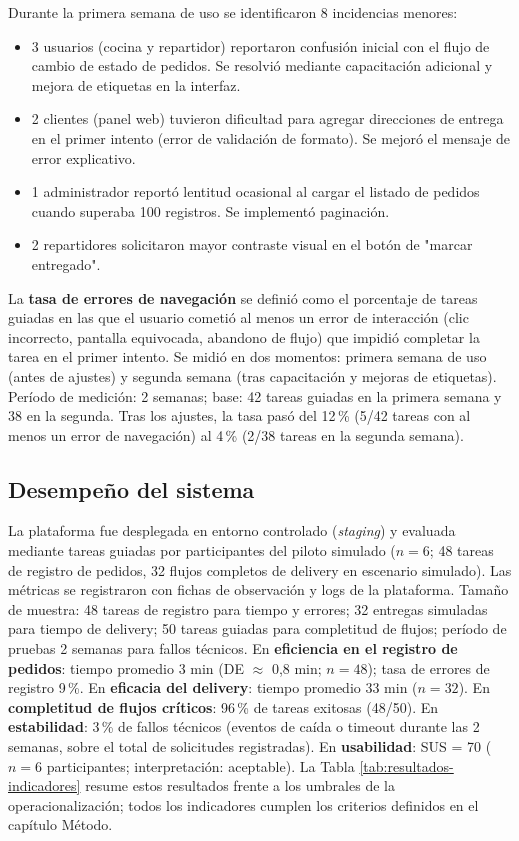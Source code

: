 Durante la primera semana de uso se identificaron 8 incidencias menores:
\begin{itemize}
  \item 3 usuarios (cocina y repartidor) reportaron confusión inicial con el flujo de cambio de estado de pedidos. Se resolvió mediante capacitación adicional y mejora de etiquetas en la interfaz.
  \item 2 clientes (panel web) tuvieron dificultad para agregar direcciones de entrega en el primer intento (error de validación de formato). Se mejoró el mensaje de error explicativo.
  \item 1 administrador reportó lentitud ocasional al cargar el listado de pedidos cuando superaba 100 registros. Se implementó paginación.
  \item 2 repartidores solicitaron mayor contraste visual en el botón de "marcar entregado".
\end{itemize}

La \textbf{tasa de errores de navegación} se definió como el porcentaje de tareas guiadas en las que el usuario cometió al menos un error de interacción (clic incorrecto, pantalla equivocada, abandono de flujo) que impidió completar la tarea en el primer intento. Se midió en dos momentos: primera semana de uso (antes de ajustes) y segunda semana (tras capacitación y mejoras de etiquetas). Período de medición: 2 semanas; base: 42 tareas guiadas en la primera semana y 38 en la segunda. Tras los ajustes, la tasa pasó del 12\,\% (5/42 tareas con al menos un error de navegación) al 4\,\% (2/38 tareas en la segunda semana).

\subsection{Desempeño del sistema }

La plataforma fue desplegada en entorno controlado (\textit{staging}) y evaluada mediante tareas guiadas por participantes del piloto simulado ($n = 6$; 48 tareas de registro de pedidos, 32 flujos completos de delivery en escenario simulado). Las métricas se registraron con fichas de observación y logs de la plataforma. Tamaño de muestra: 48 tareas de registro para tiempo y errores; 32 entregas simuladas para tiempo de delivery; 50 tareas guiadas para completitud de flujos; período de pruebas 2 semanas para fallos técnicos. En \textbf{eficiencia en el registro de pedidos}: tiempo promedio 3 min (DE $\approx$ 0,8 min; $n = 48$); tasa de errores de registro 9\,\%. En \textbf{eficacia del delivery}: tiempo promedio 33 min ($n = 32$). En \textbf{completitud de flujos críticos}: 96\,\% de tareas exitosas (48/50). En \textbf{estabilidad}: 3\,\% de fallos técnicos (eventos de caída o timeout durante las 2 semanas, sobre el total de solicitudes registradas). En \textbf{usabilidad}: SUS = 70 ($n = 6$ participantes; interpretación: aceptable). La Tabla \ref{tab:resultados-indicadores} resume estos resultados frente a los umbrales de la operacionalización; todos los indicadores cumplen los criterios definidos en el capítulo Método.

